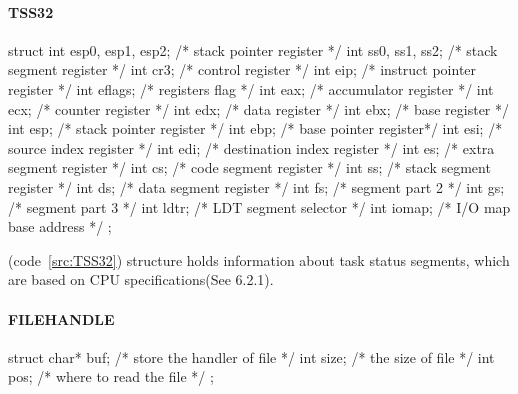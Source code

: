 \documentclass{swfcthesis}
\begin{document}
\paragraph{TSS32}

\begin{listing}[H]
  \begin{codeblock}
\begin{ccode}
struct 
{ 
  int esp0, esp1, esp2; /* stack pointer register */
  int ss0, ss1, ss2;    /* stack segment register */
  int cr3;              /* control register */
  int eip;              /* instruct pointer register */
  int eflags;           /* registers flag */
  int eax;              /* accumulator register */
  int ecx;              /* counter register */
  int edx;              /* data register */
  int ebx;              /* base register */
  int esp;              /* stack pointer register */
  int ebp;              /* base pointer register*/
  int esi;              /* source index register */
  int edi;              /* destination index register */
  int es;               /* extra segment register */
  int cs;               /* code segment register */
  int ss;               /* stack segment register */
  int ds;               /* data segment register */
  int fs;               /* segment part 2 */
  int gs;               /* segment part 3 */
  int ldtr;             /* LDT segment selector */
  int iomap;            /* I/O map base address */
};
\end{ccode}
  \end{codeblock}
  \caption{\texttt{struct TSS32}}\label{src:TSS32}
\end{listing}

(code~\ref{src:TSS32}) structure holds information about task status segments, which are
based on CPU specifications(See 6.2.1\cite{intel_3a}).


\paragraph{FILEHANDLE}

\begin{listing}[H]
  \begin{codeblock}
\begin{ccode}
struct 
{ 
  char* buf; /* store the handler of file */
  int size;  /* the size of file */
  int pos;   /* where to read the file */
};
\end{ccode}
  \end{codeblock}
  \caption{\texttt{struct FILEHANDLE}}\label{src:FILEHANDLE}
\end{listing}
\end{document}
